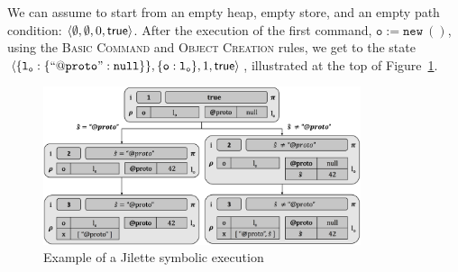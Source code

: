 We can assume to start from an empty heap, empty store, and an empty path condition: $\langle \emptyset, \emptyset, 0, {\sf true} \rangle$. After the execution of the first command, $\mathtt{o := new\ ()}$, using the \textsc{Basic Command} and \textsc{Object Creation} rules, we get to the state $\langle \{ \mathtt{l_o : \{ ``@proto" : null} \} \}, \{ \mathtt{o : l_o} \} , 1, {\sf true} \rangle$, illustrated at the top of Figure~\ref{fig:sexecexample}.

\begin{figure}[h!]
\centering
\includegraphics[width=0.83\textwidth]{symbSemEx.png}
\vspace*{-0.2cm}
\caption{Example of a Jilette symbolic execution}
\label{fig:sexecexample}
\vspace*{-0.5cm}
\end{figure}

